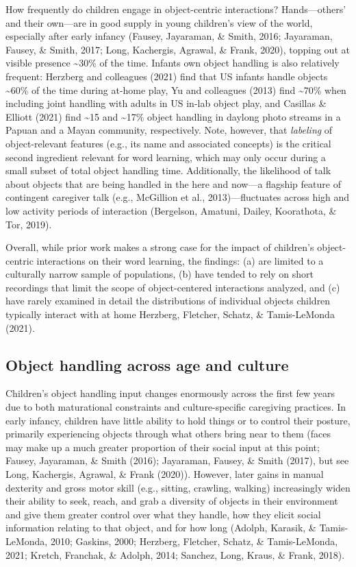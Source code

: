 \documentclass[10pt, letterpaper]{article}
\begin{document}
How frequently do children engage in object-centric interactions?
Hands---others' and their own---are in good supply in young children's
view of the world, especially after early infancy (Fausey, Jayaraman, \&
Smith, 2016; Jayaraman, Fausey, \& Smith, 2017; Long, Kachergis,
Agrawal, \& Frank, 2020), topping out at visible presence
\textasciitilde30\% of the time. Infants own object handling is also
relatively frequent: Herzberg and colleagues (2021) find that US infants
handle objects \textasciitilde60\% of the time during at-home play, Yu
and colleagues (2013) find \textasciitilde70\% when including joint
handling with adults in US in-lab object play, and Casillas \& Elliott
(2021) find \textasciitilde15 and \textasciitilde17\% object handling in
daylong photo streams in a Papuan and a Mayan community, respectively.
Note, however, that \emph{labeling} of object-relevant features (e.g.,
its name and associated concepts) is the critical second ingredient
relevant for word learning, which may only occur during a small subset
of total object handling time. Additionally, the likelihood of talk
about objects that are being handled in the here and now---a flagship
feature of contingent caregiver talk (e.g., McGillion et al.,
2013)---fluctuates across high and low activity periods of interaction
(Bergelson, Amatuni, Dailey, Koorathota, \& Tor, 2019).

Overall, while prior work makes a strong case for the impact of
children's object-centric interactions on their word learning, the
findings: (a) are limited to a culturally narrow sample of populations,
(b) have tended to rely on short recordings that limit the scope of
object-centered interactions analyzed, and (c) have rarely examined in
detail the distributions of individual objects children typically
interact with at home Herzberg, Fletcher, Schatz, \& Tamis-LeMonda
(2021).

\hypertarget{object-handling-across-age-and-culture}{%
\subsection{Object handling across age and
culture}\label{object-handling-across-age-and-culture}}

Children's object handling input changes enormously across the first few
years due to both maturational constraints and culture-specific
caregiving practices. In early infancy, children have little ability to
hold things or to control their posture, primarily experiencing objects
through what others bring near to them (faces may make up a much greater
proportion of their social input at this point; Fausey, Jayaraman, \&
Smith (2016); Jayaraman, Fausey, \& Smith (2017), but see Long,
Kachergis, Agrawal, \& Frank (2020)). However, later gains in manual
dexterity and gross motor skill (e.g., sitting, crawling, walking)
increasingly widen their ability to seek, reach, and grab a diversity of
objects in their environment and give them greater control over what
they handle, how they elicit social information relating to that object,
and for how long (Adolph, Karasik, \& Tamis-LeMonda, 2010; Gaskins,
2000; Herzberg, Fletcher, Schatz, \& Tamis-LeMonda, 2021; Kretch,
Franchak, \& Adolph, 2014; Sanchez, Long, Kraus, \& Frank, 2018).
\end{document}
